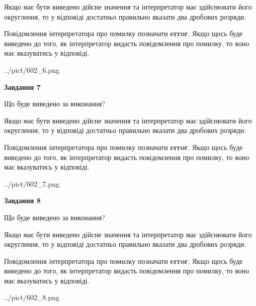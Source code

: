 \documentclass[12pt, ukrainian]{article}
\begin{document}
{\begin {Large}
Якщо має бути виведено дійсне значення та інтерпретатор має здійснювати його округлення, 
то у відповіді достатньо правильно вказати два дробових розряди.

Повідомлення інтерпретатора про помилку позначати \textbf{error}.
Якщо щось буде виведено до того, як інтерпретатор видасть повідомлення про помилку, 
то воно має вказуватись у відповіді. \par

\begin{center}
	{../pict/602_6.png}
\end{center}
\newpage

{\begin {center}\textbf{Завдання 7}\end {center}}\par
Що буде виведено за виконання? \par

Якщо має бути виведено дійсне значення та інтерпретатор має здійснювати його округлення, 
то у відповіді достатньо правильно вказати два дробових розряди.

Повідомлення інтерпретатора про помилку позначати \textbf{error}.
Якщо щось буде виведено до того, як інтерпретатор видасть повідомлення про помилку, 
то воно має вказуватись у відповіді. \par

\begin{center}
	{../pict/602_7.png}
\end{center}
\newpage

{\begin {center}\textbf{Завдання 8}\end {center}}\par
Що буде виведено за виконання? \par

Якщо має бути виведено дійсне значення та інтерпретатор має здійснювати його округлення, 
то у відповіді достатньо правильно вказати два дробових розряди.

Повідомлення інтерпретатора про помилку позначати \textbf{error}.
Якщо щось буде виведено до того, як інтерпретатор видасть повідомлення про помилку, 
то воно має вказуватись у відповіді. \par

\begin{center}
	{../pict/602_8.png}
\end{center}
\newpage


\end{Large}}
\end{document}
